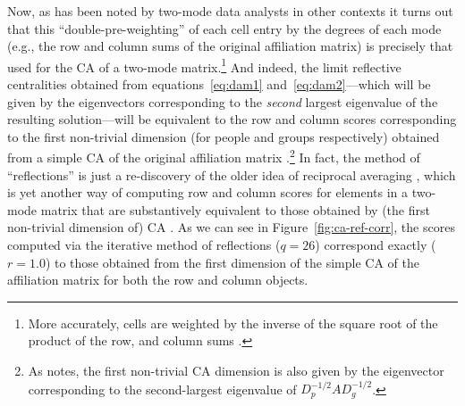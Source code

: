 \documentclass[a4paper,fleqn]{cas-sc}
\begin{document}
Now, as has been noted by two-mode data analysts in other contexts \citep[e.g.,][]{faust2005using} it turns out that this ``double-pre-weighting'' of each cell entry by the degrees of each mode (e.g., the row and column sums of the original affiliation matrix) is precisely that used for the CA of a two-mode matrix.\footnote{More accurately, cells are weighted by the inverse of the square root of the product of the row, and column sums \citep[e.g.,][124]{faust2005using}.} And indeed, the limit reflective centralities obtained from equations~\ref{eq:dam1} and~\ref{eq:dam2}---which will be given by the eigenvectors corresponding to the \textit{second} largest eigenvalue of the resulting solution---will be equivalent to the row and column scores corresponding to the first non-trivial dimension (for people and groups respectively) obtained from a simple CA of the original affiliation matrix \citep[398, eq. 9.17]{fouss2016algorithms}.\footnote{As \citet[126]{faust2005using} notes, the first non-trivial CA dimension is also given by the eigenvector corresponding to the second-largest eigenvalue of $D_p^{-1/2}AD_g^{-1/2}$.} In fact, the method of ``reflections'' is just a re-discovery of the older idea of reciprocal averaging \citep{hill1973reciprocal}, which is yet another way of computing row and column scores for elements in a two-mode matrix that are substantively equivalent to those obtained by (the first non-trivial dimension of) CA \citep{mealy2019interpreting}. As we can see in Figure~\ref{fig:ca-ref-corr}, the scores computed via the iterative method of reflections ($q = 26$) correspond exactly ($r = 1.0$) to those obtained from the first dimension of the simple CA of the affiliation matrix for both the row and column objects. 
\end{document}
